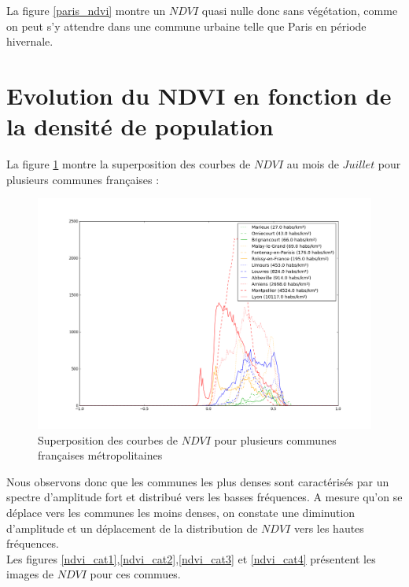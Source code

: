 \documentclass{book}
\begin{document}
La figure \ref{paris_ndvi} montre un $NDVI$ quasi nulle donc sans végétation, comme on peut s'y attendre dans une commune urbaine telle que Paris en période hivernale.\\

\section{Evolution du NDVI en fonction de la densité de population}

La figure \ref{ndvi_categorie} montre la superposition des courbes de $NDVI$ au mois de $Juillet$ pour plusieurs communes françaises :\\
\begin{figure}[H]
\centerline{
\includegraphics[scale=0.5]{../3_ndvi/images/ndvi_categorie.png}
}
\caption{Superposition des courbes de $NDVI$ pour plusieurs communes françaises métropolitaines}
\label{ndvi_categorie}
\end{figure}
\clearpage

Nous observons donc que les communes les plus denses sont caractérisés par un spectre d'amplitude fort et distribué vers les basses fréquences. A mesure 
qu'on se déplace vers les communes les moins denses, on constate une diminution d'amplitude et un déplacement de la distribution de $NDVI$ vers les
hautes fréquences.\\
Les figures \ref{ndvi_cat1},\ref{ndvi_cat2},\ref{ndvi_cat3} et \ref{ndvi_cat4} présentent les images de $NDVI$ pour ces commues.\\ 
\end{document}
